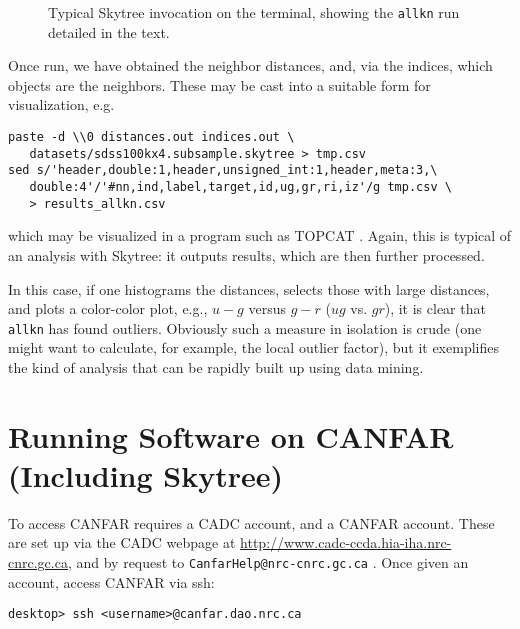 \begin{figure}
\caption{Typical Skytree invocation on the terminal, showing the {\tt allkn} run detailed in the text. \label{Fig: Terminal}}
\end{figure}

Once run, we have obtained the neighbor distances, and, via the indices, which objects are the neighbors. These may be cast into a suitable form for visualization, e.g.

\begin{verbatim}
paste -d \\0 distances.out indices.out \
   datasets/sdss100kx4.subsample.skytree > tmp.csv
sed s/'header,double:1,header,unsigned_int:1,header,meta:3,\
   double:4'/'#nn,ind,label,target,id,ug,gr,ri,iz'/g tmp.csv \
   > results_allkn.csv
\end{verbatim}

\noindent which may be visualized in a program such as TOPCAT 
 \citep{taylor:topcat}. Again, this is typical of an analysis with Skytree: it outputs results, which are then further processed.

In this case, if one histograms the distances, selects those with large distances, and plots a color-color plot, e.g., $u-g$ versus $g-r$ ($ug$ vs. $gr$), it is clear that {\tt allkn} has found outliers. Obviously such a measure in isolation is crude (one might want to calculate, for example, the local outlier factor), but it exemplifies the kind of analysis that can be rapidly built up using data mining.

\section{Running Software on CANFAR (Including Skytree)}

To access CANFAR requires a CADC account, and a CANFAR account. These are set up via the CADC webpage at \url{http://www.cadc-ccda.hia-iha.nrc-cnrc.gc.ca}, and by request to {\tt CanfarHelp@nrc-cnrc.gc.ca} . Once given an account, access CANFAR via ssh:

\begin{verbatim}
desktop> ssh <username>@canfar.dao.nrc.ca
\end{verbatim}

